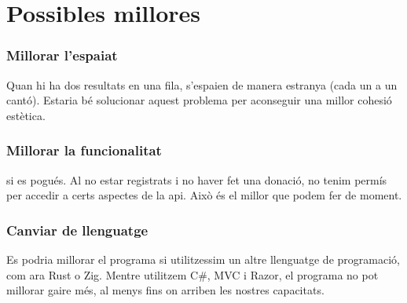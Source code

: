 \section{Possibles millores}
\subsubsection{Millorar l'espaiat}
Quan hi ha dos resultats en una fila,
s'espaien de manera estranya (cada un a un cant\'o).
Estaria b\'e solucionar aquest problema per
aconseguir una millor cohesi\'o est\`etica.

\subsubsection{Millorar la funcionalitat}
si es pogu\'es.
Al no estar registrats i no haver fet una donaci\'o,
no tenim perm\'is per accedir a certs aspectes de la api.
Aix\`o \'es el millor que podem fer de moment.

\subsubsection{Canviar de llenguatge}
Es podria millorar el programa si utilitzessim
un altre llenguatge de programaci\'o,
com ara Rust o Zig.
Mentre utilitzem C\#, MVC i Razor,
el programa no pot millorar gaire m\'es,
al menys fins on arriben les nostres capacitats.
